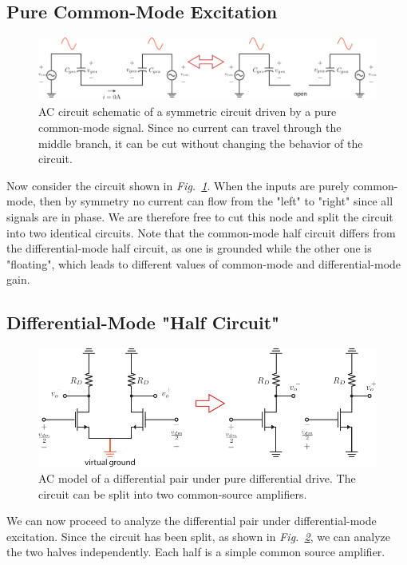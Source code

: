 \subsection{Pure Common-Mode Excitation}
\begin{figure}[tb]
\centering
\includegraphics[width=\columnwidth]{CM_model.pdf}
\caption{AC circuit schematic of a symmetric circuit driven by a pure common-mode signal.  Since no current can travel through the middle branch, it can be cut without changing the behavior of the circuit.}
\label{fig:CM_model.pdf}
\end{figure}
Now consider the circuit shown in \emph{Fig.~\ref{fig:CM_model.pdf}}.  When the inputs are purely common-mode, then by symmetry no current can flow from the "left" to "right" since all signals are in phase.  We are therefore free to cut this node and split the circuit into two identical circuits.  Note that the common-mode half circuit differs from the differential-mode half circuit, as one is grounded while the other one is "floating", which leads to different values of common-mode and differential-mode gain.
\subsection{Differential-Mode "Half Circuit"}
\begin{figure}[tb]
\centering
\includegraphics[scale=1]{Diff_Pair_DM_Drive.pdf}
\caption{AC model of a differential pair under pure differential drive.   The circuit can be split into two common-source amplifiers.}
\label{fig:Diff_Pair_DM_Drive.pdf}
\end{figure}
We can now proceed to analyze the differential pair under differential-mode excitation.  Since the circuit has been split, as shown in \emph{Fig.~\ref{fig:Diff_Pair_DM_Drive.pdf}}, we can analyze the two halves independently.  Each half is a simple common source amplifier.
